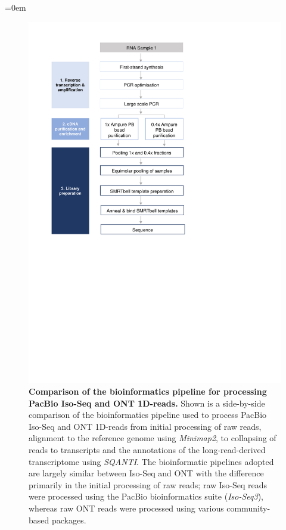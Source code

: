 \begingroup
\parindent=0em
\localtableofcontents 
\endgroup

\begin{figure}[htp]
	\centering
	\includegraphics[page=15,trim={0cm 6cm 0cm 0cm},clip,scale = 0.8]{Figures/ProjectDevelopment_Figures}
	\captionsetup{width=0.95\textwidth,singlelinecheck=off}
	\caption[Comparison of the Iso-Seq and ONT bioinformatics pipeline]%
	{\textbf{Comparison of the bioinformatics pipeline for processing PacBio Iso-Seq and ONT 1D-reads.} Shown is a side-by-side comparison of the bioinformatics pipeline used to process PacBio Iso-Seq and ONT 1D-reads from initial processing of raw reads, alignment to the reference genome using \textit{Minimap2}, to collapsing of reads to transcripts and the annotations of the long-read-derived transcriptome using \textit{SQANTI}. The bioinformatic pipelines adopted are largely similar between Iso-Seq and ONT with the difference primarily in the initial processing of raw reads; raw Iso-Seq reads were processed using the PacBio bioinformatics suite (\textit{Iso-Seq3}), whereas raw ONT reads were processed using various community-based packages.   
	}
	\label{fig:ONT_PacBio_bioinformatics}
\end{figure}

